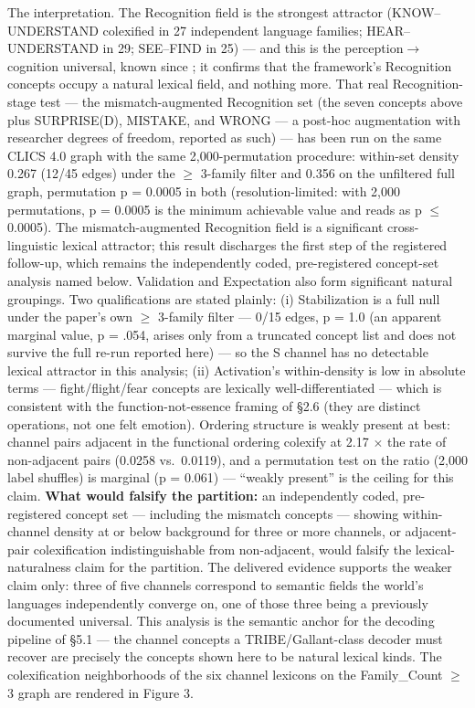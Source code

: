 \documentclass[
]{article}
\begin{document}
The interpretation. The Recognition field is the strongest attractor
(KNOW--UNDERSTAND colexified in 27 independent language families;
HEAR--UNDERSTAND in 29; SEE--FIND in 25) --- and this is the
perception\(\to\)cognition universal, known since ; it confirms that the
framework's Recognition concepts occupy a natural lexical field, and
nothing more. That real Recognition-stage test --- the
mismatch-augmented Recognition set (the seven concepts above plus
SURPRISE(D), MISTAKE, and WRONG --- a post-hoc augmentation with
researcher degrees of freedom, reported as such) --- has been run on the
same CLICS 4.0 graph with the same 2,000-permutation procedure:
within-set density 0.267 (12/45 edges) under the \(\geq\) 3-family
filter and 0.356 on the unfiltered full graph, permutation p = 0.0005 in
both (resolution-limited: with 2,000 permutations, p = 0.0005 is the
minimum achievable value and reads as p \(\leq\) 0.0005). The
mismatch-augmented Recognition field is a significant cross-linguistic
lexical attractor; this result discharges the first step of the
registered follow-up, which remains the independently coded,
pre-registered concept-set analysis named below. Validation and
Expectation also form significant natural groupings. Two qualifications
are stated plainly: (i) Stabilization is a full null under the paper's
own \(\geq\) 3-family filter --- 0/15 edges, p = 1.0 (an apparent
marginal value, p = .054, arises only from a truncated concept list and
does not survive the full re-run reported here) --- so the S channel has
no detectable lexical attractor in this analysis; (ii) Activation's
within-density is low in absolute terms --- fight/flight/fear concepts
are lexically well-differentiated --- which is consistent with the
function-not-essence framing of §2.6 (they are distinct operations, not
one felt emotion). Ordering structure is weakly present at best: channel
pairs adjacent in the functional ordering colexify at 2.17 \(\times\)
the rate of non-adjacent pairs (0.0258 vs.~0.0119), and a permutation
test on the ratio (2,000 label shuffles) is marginal (p = 0.061) ---
``weakly present'' is the ceiling for this claim. \textbf{What would
falsify the partition:} an independently coded, pre-registered concept
set --- including the mismatch concepts --- showing within-channel
density at or below background for three or more channels, or
adjacent-pair colexification indistinguishable from non-adjacent, would
falsify the lexical-naturalness claim for the partition. The delivered
evidence supports the weaker claim only: three of five channels
correspond to semantic fields the world's languages independently
converge on, one of those three being a previously documented universal.
This analysis is the semantic anchor for the decoding pipeline of §5.1
--- the channel concepts a TRIBE/Gallant-class decoder must recover are
precisely the concepts shown here to be natural lexical kinds. The
colexification neighborhoods of the six channel lexicons on the
Family\_Count \(\geq\) 3 graph are rendered in Figure 3.
\end{document}
